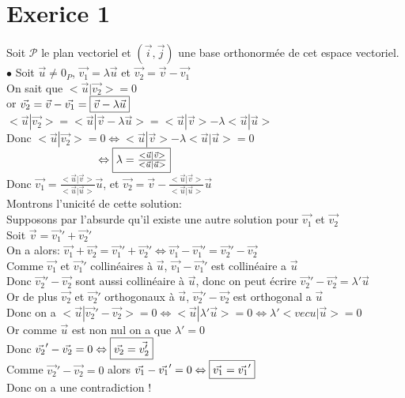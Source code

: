 \documentclass{article}
\author{Frederic Becerril}
\newcommand\tab[1][1cm]{\hspace*{#1}}
\begin{document}
\part*{Exerice 1}

Soit $\mathcal{P}$ le plan vectoriel et $(\vec{i}, \vec{j})$ une base orthonormée de cet espace vectoriel.\\
$\bullet$ Soit $\vec{u} \neq 0_P$,  
$\vec{v_1} = \lambda \vec{u}$ et $\vec{v_2} = \vec{v} - \vec{v_1}$\\
On sait que $<\vec{u}|\vec{v_2}> = 0$\\
or $\vec{v_2} = \vec{v} - \vec{v_1} = \fbox{$\vec{v} - \lambda \vec{u}$}$\\
$<\vec{u}|\vec{v_2}> = <\vec{u}| \vec{v} - \lambda \vec{u}> = <\vec{u}|\vec{v}> - \lambda <\vec{u}|\vec{u}>$\\
Donc  $<\vec{u}|\vec{v_2}> = 0 \Leftrightarrow  <\vec{u}|\vec{v}> - \lambda <\vec{u}|\vec{u}> = 0$\\
$\tab[2.9cm] \Leftrightarrow \fbox{$\lambda = \frac{ <\vec{u}|\vec{v}>}{<\vec{u}|\vec{u}>}$}$\\
Donc $\vec{v_1} = \frac{<\vec{u}|\vec{v}>}{<\vec{u}|\vec{u}>}\vec{u}$, et $\vec{v_2} = \vec{v} - \frac{<\vec{u}|\vec{v}>}{<\vec{u}|\vec{u}>}\vec{u}$\\
Montrons l'unicité de cette solution:\\
Supposons par l'absurde qu'il existe une autre solution pour $\vec{v_1}$ et $\vec{v_2}$\\
Soit $\vec{v} = \vec{v_1}' + \vec{v_2}'$\\
On a alors: $\vec{v_1} + \vec{v_2} = \vec{v_1}' + \vec{v_2}' \Leftrightarrow \vec{v_1} - \vec{v_1}' = \vec{v_2}' - \vec{v_2}$\\
Comme $\vec{v_1}$ et $\vec{v_1}'$ collinéaires à $\vec{u}$, $\vec{v_1} - \vec{v_1}'$ est collinéaire a $\vec{u}$\\
Donc $\vec{v_2}' - \vec{v_2}$ sont aussi collinéaire à $\vec{u}$, donc on peut écrire $\vec{v_2}' - \vec{v_2} = \lambda' \vec{u}$\\
Or de plus $\vec{v_2}$ et $\vec{v_2}'$ orthogonaux à $\vec{u}$, $\vec{v_2}' - \vec{v_2}$ est orthogonal a $\vec{u}$\\
Donc on a $<\vec{u} | \vec{v_2}' - \vec{v_2}> = 0 \Leftrightarrow <\vec{u} | \lambda' \vec{u}> = 0 \Leftrightarrow \lambda' <vec{u}|\vec{u}> = 0$\\
Or comme $\vec{u}$ est non nul on a que $\lambda' = 0$\\
Donc $\vec{v_2}' - \vec{v_2} = 0 \Leftrightarrow \fbox{$\vec{v_2} = \vec{v_2'}$}$\\
Comme $\vec{v_2}' - \vec{v_2} = 0$ alors $\vec{v_1} - \vec{v_1}' = 0 \Leftrightarrow \fbox{$\vec{v_1} = \vec{v_1}'$}$\\
Donc on a une contradiction !\\
\newpage
\end{document}
